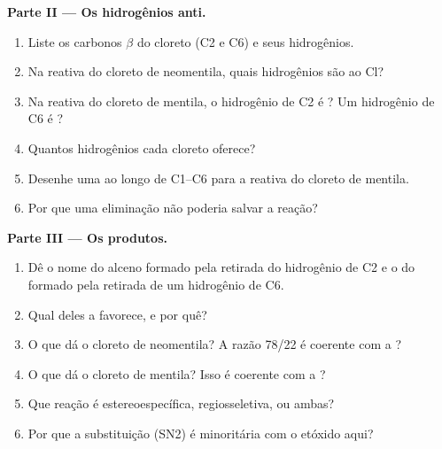 \begin{problem}
\medskip
\noindent\textbf{Parte II --- Os hidrogênios anti.}
\begin{enumerate}[resume]
  \item Liste os carbonos $\beta$ do cloreto (C2 e C6) e seus
        hidrogênios.
  \item Na  reativa do cloreto de neomentila, quais hidrogênios
        são  ao Cl?
  \item Na  reativa do cloreto de mentila, o hidrogênio de C2 é
        ? Um hidrogênio de C6 é ?
  \item Quantos hidrogênios  cada cloreto oferece?
  \item Desenhe uma  ao longo de C1--C6 para a 
        reativa do cloreto de mentila.
  \item Por que uma eliminação  não poderia salvar a
        reação?
\end{enumerate}

\medskip
\noindent\textbf{Parte III --- Os produtos.}
\begin{enumerate}[resume]
  \item Dê o nome do alceno formado pela retirada do hidrogênio de C2 e o
        do formado pela retirada de um hidrogênio de C6.
  \item Qual deles a  favorece, e por quê?
  \item O que dá o cloreto de neomentila? A razão 78/22 é coerente com a
        ?
  \item O que dá o cloreto de mentila? Isso é coerente com a ?
  \item Que reação é estereoespecífica, regiosseletiva, ou ambas?
  \item Por que a substituição (SN2) é minoritária com o etóxido aqui?
\end{enumerate}


\end{problem}
